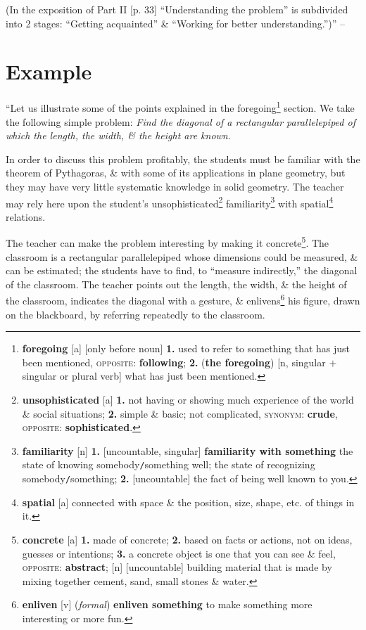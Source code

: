 \documentclass[oneside]{book}
\numberwithin{equation}{section}
\begin{document}
(In the exposition of Part II [p. 33] ``Understanding the problem'' is subdivided into 2 stages: ``Getting acquainted'' \& ``Working for better understanding.'')'' -- \cite[pp. 6--7]{Polya2014}

\section{Example}
``Let us illustrate some of the points explained in the foregoing\footnote{\textbf{foregoing} [a] [only before noun] \textbf{1.} used to refer to something that has just been mentioned, \textsc{opposite}: \textbf{following}; \textbf{2.} (\textbf{the foregoing}) [n, singular $+$ singular or plural verb] what has just been mentioned.} section. We take the following simple problem: \textit{Find the diagonal of a rectangular parallelepiped of which the length, the width, \& the height are known}.

In order to discuss this problem profitably, the students must be familiar with the theorem of Pythagoras, \& with some of its applications in plane geometry, but they may have very little systematic knowledge in solid geometry. The teacher may rely here upon the student's unsophisticated\footnote{\textbf{unsophisticated} [a] \textbf{1.} not having or showing much experience of the world \& social situations; \textbf{2.} simple \& basic; not complicated, \textsc{synonym}: \textbf{crude}, \textsc{opposite}: \textbf{sophisticated}.} familiarity\footnote{\textbf{familiarity} [n] \textbf{1.} [uncountable, singular] \textbf{familiarity with something} the state of knowing somebody\texttt{/}something well; the state of recognizing somebody\texttt{/}something; \textbf{2.} [uncountable] the fact of being well known to you.} with spatial\footnote{\textbf{spatial} [a] connected with space \& the position, size, shape, etc. of things in it.} relations.

The teacher can make the problem interesting by making it concrete\footnote{\textbf{concrete} [a] \textbf{1.} made of concrete; \textbf{2.} based on facts or actions, not on ideas, guesses or intentions; \textbf{3.} a concrete object is one that you can see \& feel, \textsc{opposite}: \textbf{abstract}; [n] [uncountable] building material that is made by mixing together cement, sand, small stones \& water.}. The classroom is a rectangular parallelepiped whose dimensions could be measured, \& can be estimated; the students have to find, to ``measure indirectly,'' the diagonal of the classroom. The teacher points out the length, the width, \& the height of the classroom, indicates the diagonal with a gesture, \& enlivens\footnote{\textbf{enliven} [v] (\textit{formal}) \textbf{enliven something} to make something more interesting or more fun.} his figure, drawn on the blackboard, by referring repeatedly to the classroom.
\end{document}
